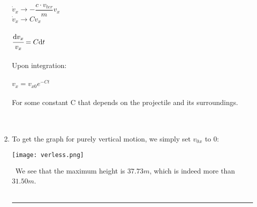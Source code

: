 \documentclass[11pt]{article}
\begin{document}
\begin{enumerate}
     \\
    $\dot{v}_x \longrightarrow -\dfrac{c\cdot v_{ter}}{m} v_x$
     \\
     $\dot{v}_x \longrightarrow C v_x$
     \\
     \\
     $\cfrac{\mathrm{d} v_x}{v_x} = C\mathrm{d}t$ \\
     \\
     Upon integration:
     \\
     \\
    $v_x = v_{x0}e^{-Ct} $
     \\
     \\
    For some constant C that depends on the projectile and its surroundings.
     \\
     \\
     \\
    \item To get the graph for purely vertical motion, we simply set $v_0$$_x$ to 0:

\begin{center}
  \texttt{[image: verless.png]}
\end{center} \ 
We see that the maximum height is $37.73m$, which is indeed more than $31.50m$.
 \\
 \\

\noindent\rule{16cm}{0.4pt}


\end{enumerate}
\end{document}
